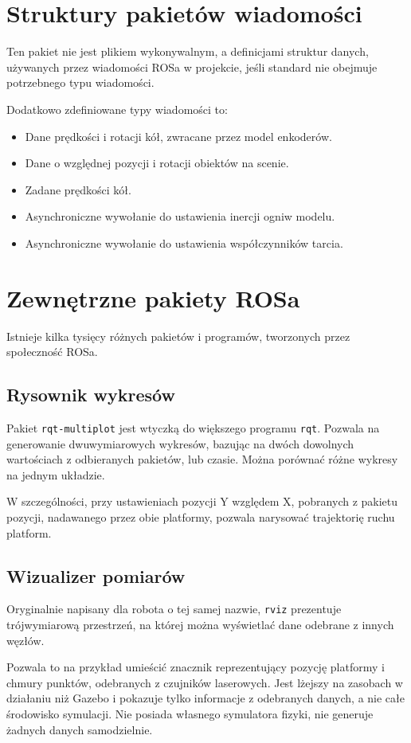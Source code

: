 \section{Struktury pakietów wiadomości}
	Ten pakiet nie jest plikiem wykonywalnym, a definicjami struktur danych, używanych przez wiadomości ROSa w projekcie, jeśli 
	standard nie obejmuje potrzebnego typu wiadomości.
	
	Dodatkowo zdefiniowane typy wiadomości to:
	\begin{itemize}
		\item Dane prędkości i rotacji kół, zwracane przez model enkoderów.
		\item Dane o względnej pozycji i rotacji obiektów na scenie.
		\item Zadane prędkości kół.
		\item Asynchroniczne wywołanie do ustawienia inercji ogniw modelu.
		\item Asynchroniczne wywołanie do ustawienia współczynników tarcia.
	\end{itemize}

\section{Zewnętrzne pakiety ROSa}
	Istnieje kilka tysięcy różnych pakietów i programów, tworzonych przez społeczność ROSa.
	
	\subsection{Rysownik wykresów}
		Pakiet \texttt{rqt-multiplot} jest wtyczką do większego programu \texttt{rqt}.
		Pozwala na generowanie dwuwymiarowych wykresów, bazując na dwóch dowolnych wartościach z odbieranych pakietów, lub czasie.
		Można porównać różne wykresy na jednym układzie.
		
		W szczególności, przy ustawieniach pozycji Y względem X, pobranych z pakietu pozycji, nadawanego przez obie platformy, pozwala narysować trajektorię ruchu platform.
		
	\subsection{Wizualizer pomiarów}
		Oryginalnie napisany dla robota o tej samej nazwie, \texttt{rviz} prezentuje trójwymiarową przestrzeń, na której można wyświetlać 
		dane odebrane z innych węzłów.
		
		Pozwala to na przykład umieścić znacznik reprezentujący pozycję platformy i chmury punktów, odebranych z czujników laserowych.
		Jest lżejszy na zasobach w działaniu niż Gazebo i pokazuje tylko informacje z odebranych danych, a nie całe środowisko symulacji.
		Nie posiada własnego symulatora fizyki, nie generuje żadnych danych samodzielnie.
		

